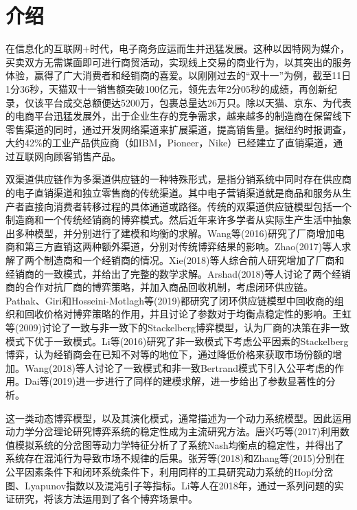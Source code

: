 \documentclass{article}
\begin{document}
\section{介绍}
\par 在信息化的互联网$+$时代，电子商务应运而生并迅猛发展。这种以因特网为媒介，买卖双方无需谋面即可进行商贸活动，实现线上交易的商业行为，以其突出的服务体验，赢得了广大消费者和经销商的喜爱。以刚刚过去的“双十一”为例，截至11日1分36秒，天猫双十一销售额突破100亿元，领先去年2分05秒的成绩，再创新纪录，仅该平台成交总额便达5200万，包裹总量达26万只。除以天猫、京东、为代表的电商平台迅猛发展外，出于企业生存的竞争需求，越来越多的制造商在保留线下零售渠道的同时，通过开发网络渠道来扩展渠道，提高销售量。据纽约时报调查\cite{2018CNNIC}，大约42\%的工业产品供应商（如IBM，Pioneer，Nike）已经建立了直销渠道，通过互联网向顾客销售产品。
\par 双渠道供应链作为多渠道供应链的一种特殊形式，是指分销系统中同时存在供应商的电子直销渠道和独立零售商的传统渠道。其中电子营销渠道就是商品和服务从生产者直接向消费者转移过程的具体通道或路径。传统的双渠道供应链模型包括一个制造商和一个传统经销商的博弈模式。然后近年来许多学者从实际生产生活中抽象出多种模型，并分别进行了建模和均衡的求解。Wang等(2016)\cite{2016Wang}研究了厂商增加电商和第三方直销这两种额外渠道，分别对传统博弈结果的影响。Zhao(2017)\cite{2017Zhao}等人求解了两个制造商和一个经销商的情况。Xie(2018)\cite{2018Xie}等人综合前人研究增加了厂商和经销商的一致模式，并给出了完整的数学求解。Arshad(2018)\cite{2018Arshad}等人讨论了两个经销商的合作对抗厂商的博弈策略，并加入商品回收机制，考虑闭环供应链。Pathak、Giri和Hosseini-Motlagh等(2019)\cite{2019Pathak}\cite{2019Giri,2019Hosseini-Motlagh}都研究了闭环供应链模型中回收商的组织和回收价格对博弈策略的作用，并且讨论了参数对于均衡点稳定性的影响。王虹等(2009)\cite{2009Wang}讨论了一致与非一致下的Stackelberg博弈模型，认为厂商的决策在非一致模式下优于一致模式。Li等(2016)\cite{2016Li}研究了非一致模式下考虑公平因素的Stackelberg博弈，认为经销商会在已知不对等的地位下，通过降低价格来获取市场份额的增加。Wang(2018)\cite{2018Wang}等人讨论了一致模式和非一致Bertrand模式下引入公平考虑的作用。Dai等(2019)\cite{2019Dai}进一步进行了同样的建模求解，进一步给出了参数显著性的分析。
\par 这一类动态博弈模型，以及其演化模式，通常描述为一个动力系统模型。因此运用动力学分岔理论研究博弈系统的稳定性成为主流研究方法。唐兴巧等(2017)\cite{2017Tang}利用数值模拟系统的分岔图等动力学特征分析了了系统Nash均衡点的稳定性，并得出了系统存在混沌行为导致市场不规律的后果。张芳等(2018)\cite{2018Zhang}和Zhang等(2015)\cite{2015Zhang}分别在公平因素条件下和闭环系统条件下，利用同样的工具研究动力系统的Hopf分岔图、Lyapunov指数以及混沌引子等指标。Li等人在2018年，通过一系列问题的实证研究，将该方法运用到了各个博弈场景中\cite{2018Huang,2018Qiu-Xiang,2019Qiu-Xiang1,2019Qiu-Xiang2}。
\end{document}

